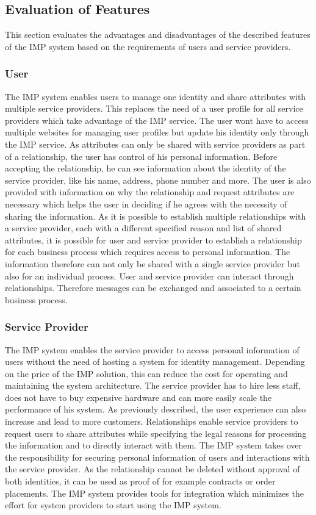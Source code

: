 \subsection{Evaluation of Features}

This section evaluates the advantages and disadvantages of the described features of the IMP system based on the requirements of users and service providers.

\subsubsection{User}
The IMP system enables users to manage one identity and share attributes with multiple service providers. This replaces the need of a user profile for all service providers which take advantage of the IMP service. The user wont have to access multiple websites for managing user profiles but update his identity only through the IMP service.
As attributes can only be shared with service providers as part of a relationship, the user has control of his personal information. Before accepting the relationship, he can see information about the identity of the service provider, like his name, address, phone number and more. The user is also provided with information on why the relationship and request attributes are necessary which helps the user in deciding if he agrees with the necessity of sharing the information. As it is possible to establish multiple relationships with a service provider, each with a different specified reason and list of shared attributes, it is possible for user and service provider to establish a relationship for each business process which requires access to personal information. The information therefore can not only be shared with a single service provider but also for an individual process. User and service provider can interact through relationships. Therefore messages can be exchanged and associated to a certain business process.

\subsubsection{Service Provider}

The IMP system enables the service provider to access personal information of users without the need of hosting a system for identity management. Depending on the price of the IMP solution, this can reduce the cost for operating and maintaining the system architecture. The service provider has to hire less staff, does not have to buy expensive hardware and can more easily scale the performance of his system. As previously described, the user experience can also increase and lead to more customers. Relationships enable service providers to request users to share attributes while specifying the legal reasons for processing the information and to directly interact with them. The IMP system takes over the responsibility for securing personal information of users and interactions with the service provider. As the relationship cannot be deleted without approval of both identities, it can be used as proof of for example contracts or order placements. The IMP system provides tools for integration which minimizes the effort for system providers to start using the IMP system.


